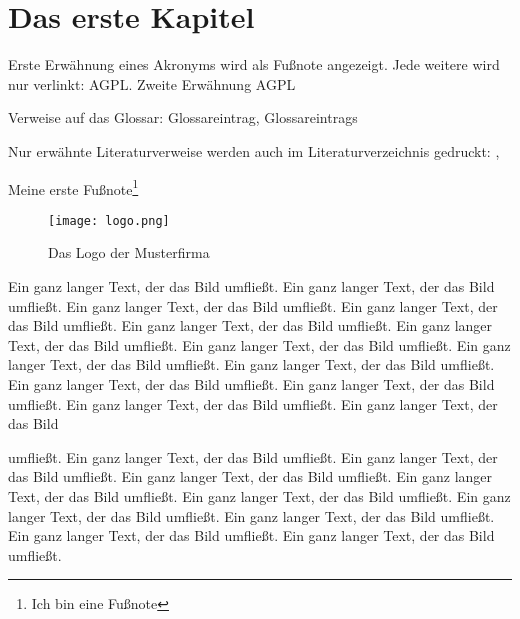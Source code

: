 
\chapter{Das erste Kapitel}
Erste Erwähnung eines Akronyms wird als Fußnote angezeigt. Jede weitere wird
nur verlinkt: \ac{AGPL}. Zweite Erwähnung \ac{AGPL} \cite{fsf:2007}

Verweise auf das Glossar: \gls{Glossareintrag}, \glspl{Glossareintrag}

Nur erwähnte Literaturverweise werden auch im Literaturverzeichnis gedruckt:
\cite{baumgartner:2002}, \cite{dreyfus:1980}

Meine erste Fußnote\footnote{Ich bin eine Fußnote}

\begin{wrapfigure}{r}{.4\textwidth}
\texttt{[image: logo.png]}
\vspace{-15pt}
\caption{Das Logo der Musterfirma\footnotemark}
\end{wrapfigure}
Ein ganz langer Text, der das Bild umfließt. Ein ganz langer Text, der das Bild
umfließt. Ein ganz langer Text, der das Bild umfließt. Ein ganz langer Text, der
das Bild umfließt. Ein ganz langer Text, der das Bild umfließt. Ein ganz langer
Text, der das Bild umfließt. Ein ganz langer Text, der das Bild umfließt. Ein
ganz langer Text, der das Bild umfließt. Ein ganz langer Text, der das Bild
umfließt. Ein ganz langer Text, der das Bild umfließt. Ein ganz langer Text, der
das Bild umfließt. Ein ganz langer Text, der das Bild umfließt. Ein ganz langer Text, der das Bild

umfließt. Ein ganz langer Text, der das Bild umfließt. Ein ganz langer Text, der
das Bild umfließt. Ein ganz langer Text, der das Bild umfließt. Ein ganz langer
Text, der das Bild umfließt. Ein ganz langer Text, der das Bild umfließt. Ein
ganz langer Text, der das Bild umfließt. Ein ganz langer Text, der das Bild
umfließt. Ein ganz langer Text, der das Bild umfließt. Ein ganz langer Text, der
das Bild umfließt.

